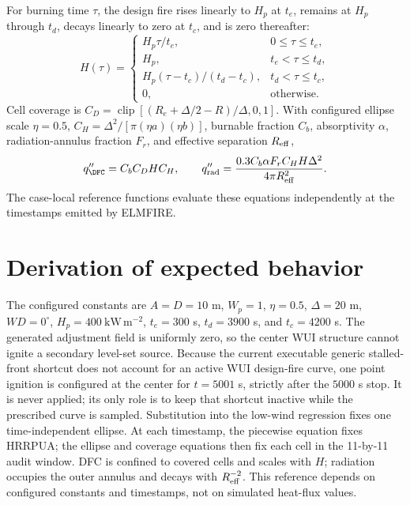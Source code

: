 For burning time \(\tau\), the design fire rises linearly to \(H_p\) at \(t_e\), remains at \(H_p\) through \(t_d\), decays linearly to zero at \(t_c\), and is zero thereafter:
\[
H(\tau)=
\begin{cases}
H_p\tau/t_e,&0\le\tau\le t_e,\\
H_p,&t_e<\tau\le t_d,\\
H_p(\tau-t_c)/(t_d-t_c),&t_d<\tau\le t_c,\\
0,&\text{otherwise}.
\end{cases}
\]
Cell coverage is \(C_D=\operatorname{clip}[(R_e+\Delta/2-R)/\Delta,0,1]\).
With configured ellipse scale \(\eta=0.5\), \(C_H=\Delta^2/[\pi(\eta a)(\eta b)]\), burnable fraction \(C_b\), absorptivity \(\alpha\), radiation-annulus fraction \(F_r\), and effective separation \(R_{\rm eff}\),
\[
 q''_{\DFC}=C_bC_DHC_H,\qquad
 q''_{\rm rad}=\frac{0.3C_b\alpha F_r C_HH\Delta^2}{4\pi R_{\rm eff}^2}.
\]
The case-local reference functions evaluate these equations independently at the timestamps emitted by ELMFIRE.

\section{Derivation of expected behavior}

The configured constants are \(A=D=10\) m, \(W_p=1\), \(\eta=0.5\), \(\Delta=20\) m, \(WD=0^\circ\), \(H_p=400~\mathrm{kW\,m^{-2}}\), \(t_e=300\) s, \(t_d=3900\) s, and \(t_c=4200\) s. The generated adjustment field is uniformly zero, so the center WUI structure cannot ignite a secondary level-set source. Because the current executable generic stalled-front shortcut does not account for an active WUI design-fire curve, one point ignition is configured at the center for \(t=5001\) s, strictly after the \(5000\) s stop. It is never applied; its only role is to keep that shortcut inactive while the prescribed curve is sampled. Substitution into the low-wind regression fixes one time-independent ellipse. At each timestamp, the piecewise equation fixes HRRPUA; the ellipse and coverage equations then fix each cell in the 11-by-11 audit window. DFC is confined to covered cells and scales with \(H\); radiation occupies the outer annulus and decays with \(R_{\rm eff}^{-2}\). This reference depends on configured constants and timestamps, not on simulated heat-flux values.

